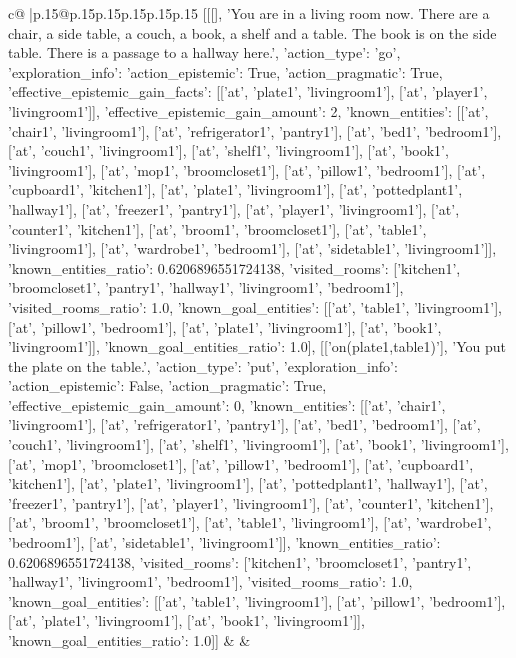 \documentclass{article}
\begin{document}
{\begin{supertabular}{c@{$\;$}|p{.15\linewidth}@{}p{.15\linewidth}p{.15\linewidth}p{.15\linewidth}p{.15\linewidth}p{.15\linewidth}}
{{{	 [[[], 'You are in a living room now. There are a chair, a side table, a couch, a book, a shelf and a table. The book is on the side table. There is a passage to a hallway here.', {'action_type': 'go', 'exploration_info': {'action_epistemic': True, 'action_pragmatic': True, 'effective_epistemic_gain_facts': [['at', 'plate1', 'livingroom1'], ['at', 'player1', 'livingroom1']], 'effective_epistemic_gain_amount': 2, 'known_entities': [['at', 'chair1', 'livingroom1'], ['at', 'refrigerator1', 'pantry1'], ['at', 'bed1', 'bedroom1'], ['at', 'couch1', 'livingroom1'], ['at', 'shelf1', 'livingroom1'], ['at', 'book1', 'livingroom1'], ['at', 'mop1', 'broomcloset1'], ['at', 'pillow1', 'bedroom1'], ['at', 'cupboard1', 'kitchen1'], ['at', 'plate1', 'livingroom1'], ['at', 'pottedplant1', 'hallway1'], ['at', 'freezer1', 'pantry1'], ['at', 'player1', 'livingroom1'], ['at', 'counter1', 'kitchen1'], ['at', 'broom1', 'broomcloset1'], ['at', 'table1', 'livingroom1'], ['at', 'wardrobe1', 'bedroom1'], ['at', 'sidetable1', 'livingroom1']], 'known_entities_ratio': 0.6206896551724138, 'visited_rooms': ['kitchen1', 'broomcloset1', 'pantry1', 'hallway1', 'livingroom1', 'bedroom1'], 'visited_rooms_ratio': 1.0, 'known_goal_entities': [['at', 'table1', 'livingroom1'], ['at', 'pillow1', 'bedroom1'], ['at', 'plate1', 'livingroom1'], ['at', 'book1', 'livingroom1']], 'known_goal_entities_ratio': 1.0}}], [['on(plate1,table1)'], 'You put the plate on the table.', {'action_type': 'put', 'exploration_info': {'action_epistemic': False, 'action_pragmatic': True, 'effective_epistemic_gain_amount': 0, 'known_entities': [['at', 'chair1', 'livingroom1'], ['at', 'refrigerator1', 'pantry1'], ['at', 'bed1', 'bedroom1'], ['at', 'couch1', 'livingroom1'], ['at', 'shelf1', 'livingroom1'], ['at', 'book1', 'livingroom1'], ['at', 'mop1', 'broomcloset1'], ['at', 'pillow1', 'bedroom1'], ['at', 'cupboard1', 'kitchen1'], ['at', 'plate1', 'livingroom1'], ['at', 'pottedplant1', 'hallway1'], ['at', 'freezer1', 'pantry1'], ['at', 'player1', 'livingroom1'], ['at', 'counter1', 'kitchen1'], ['at', 'broom1', 'broomcloset1'], ['at', 'table1', 'livingroom1'], ['at', 'wardrobe1', 'bedroom1'], ['at', 'sidetable1', 'livingroom1']], 'known_entities_ratio': 0.6206896551724138, 'visited_rooms': ['kitchen1', 'broomcloset1', 'pantry1', 'hallway1', 'livingroom1', 'bedroom1'], 'visited_rooms_ratio': 1.0, 'known_goal_entities': [['at', 'table1', 'livingroom1'], ['at', 'pillow1', 'bedroom1'], ['at', 'plate1', 'livingroom1'], ['at', 'book1', 'livingroom1']], 'known_goal_entities_ratio': 1.0}}]] 
	  } 
	   } 
	   } 
	 & & \\ 
 


\end{supertabular}}
\end{document}
